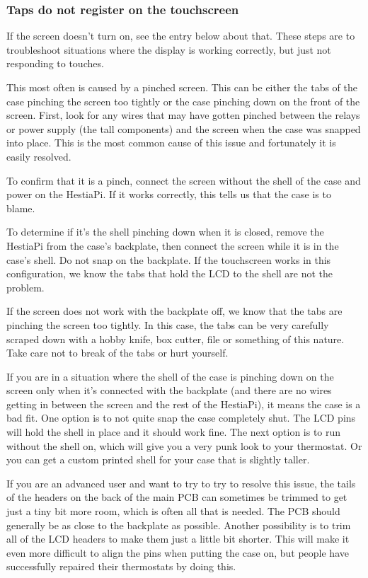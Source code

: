 \subsubsection{Taps do not register on the touchscreen}
If the screen doesn't turn on, see the entry below about that. These steps are
to troubleshoot situations where the display is working correctly, but just not
responding to touches.

This most often is caused by a pinched screen. This can be either the tabs of
the case pinching the screen too tightly or the case pinching down on the front
of the screen. First, look for any wires that may have gotten pinched between
the relays or power supply (the tall components) and the screen when the case
was snapped into place. This is the most common cause of this issue and
fortunately it is easily resolved.

To confirm that it is a pinch, connect the screen without the shell of the case
and power on the HestiaPi. If it works correctly, this tells us that the case
is to blame.

To determine if it's the shell pinching down when it is closed, remove the
HestiaPi from the case's backplate, then connect the screen while it is in the
case's shell. Do not snap on the backplate. If the touchscreen works in this
configuration, we know the tabs that hold the LCD to the shell are not the
problem.

If the screen does not work with the backplate off, we know that the tabs are
pinching the screen too tightly. In this case, the tabs can be very carefully
scraped down with a hobby knife, box cutter, file or something of this nature.
Take care not to break of the tabs or hurt yourself.

If you are in a situation where the shell of the case is pinching down on the
screen only when it's connected with the backplate (and there are no wires
getting in between the screen and the rest of the HestiaPi), it means the case
is a bad fit. One option is to not quite snap the case completely shut. The LCD
pins will hold the shell in place and it should work fine. The next option is
to run without the shell on, which will give you a very punk look to your
thermostat. Or you can get a custom printed shell for your case that is slightly
taller.

If you are an advanced user and want to try to try to resolve this issue, the
tails of the headers on the back of the main PCB can sometimes be trimmed to
get just a tiny bit more room, which is often all that is needed. The PCB
should generally be as close to the backplate as possible. Another possibility
is to trim all of the LCD headers to make them just a little bit shorter. This
will make it even more difficult to align the pins when putting the case on,
but people have successfully repaired their thermostats by doing this.

